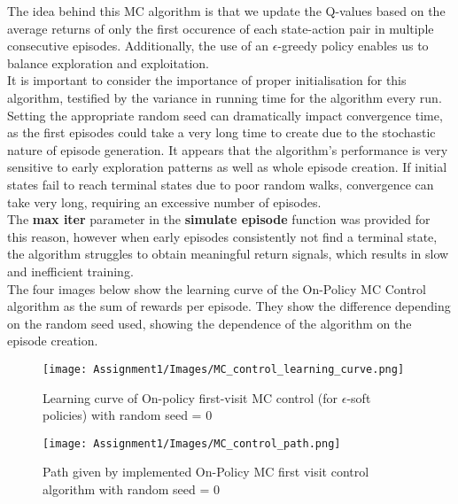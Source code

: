 \documentclass[11pt,a4paper]{article}
\begin{document}
\noindent The idea behind this MC algorithm is that we update the Q-values based on the average returns of only the first occurence of each state-action pair in multiple consecutive episodes. Additionally, the use of an $\epsilon$-greedy policy enables us to balance exploration and exploitation. \\

\noindent It is important to consider the importance of proper initialisation for this algorithm, testified by the variance in running time for the algorithm every run. Setting the appropriate random seed can dramatically impact convergence time, as the first episodes could take a very long time to create due to the stochastic nature of episode generation. It appears that the algorithm's performance is very sensitive to early exploration patterns as well as whole episode creation. If initial states fail to reach terminal states due to poor random walks, convergence can take very long, requiring an excessive number of episodes. \\

\noindent The \textbf{max iter} parameter in the \textbf{simulate episode} function was provided for this reason, however when early episodes consistently not find a terminal state, the algorithm struggles to obtain meaningful return signals, which results in slow and inefficient training. \\

\noindent The four images below show the learning curve of the On-Policy MC Control algorithm as the sum of rewards per episode. They show the difference depending on the random seed used, showing the dependence of the algorithm on the episode creation.

\begin{figure}[h!]
    \centering
    \begin{minipage}{0.55\textwidth}
        \centering
        \texttt{[image: Assignment1/Images/MC\_control\_learning\_curve.png]}
        \caption{Learning curve of On-policy first-visit MC control (for $\epsilon$-soft policies) with random seed = 0}
        \label{fig:fig1}
    \end{minipage}%
    \hfill
    \begin{minipage}{0.4\textwidth}
        \centering
        \texttt{[image: Assignment1/Images/MC\_control\_path.png]}
        \caption{Path given by implemented On-Policy MC first visit control algorithm with random seed = 0}
        \label{fig:fig2}
    \end{minipage}
\end{figure}
\end{document}
